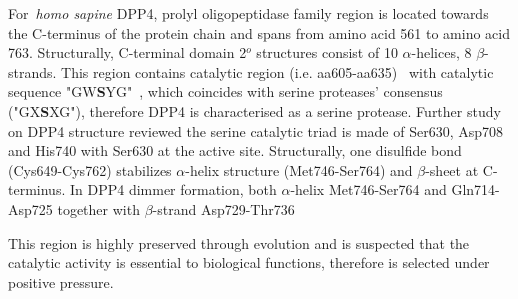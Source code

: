 For~\textit{homo sapine} DPP4, prolyl oligopeptidase family region is located towards the C-terminus of the protein chain and spans from amino acid 561 to amino acid 763. Structurally, C-terminal domain 2$^{o}$ structures consist of 10 $\alpha$-helices, 8 $\beta$-strands. This region contains catalytic region (i.e. aa605-aa635)~\cite{Rawlings1991,Barrett1992,Polgár1992,Rawlings1994} with catalytic sequence "GW\textbf{S}YG"~\cite{Ogata_1992}, which coincides with serine proteases' consensus ("GX\textbf{S}XG"), therefore DPP4 is characterised as a serine protease. Further study on DPP4 structure reviewed the serine catalytic triad is made of Ser630, Asp708 and His740 with Ser630 at the active site. Structurally, one disulfide bond (Cys649-Cys762) stabilizes $\alpha$-helix structure (Met746-Ser764) and $\beta$-sheet at C-terminus. In DPP4 dimmer formation, both $\alpha$-helix Met746-Ser764 and Gln714-Asp725 together with $\beta$-strand Asp729-Thr736 
\par
This region is highly preserved through evolution and is suspected that the catalytic activity is essential to biological functions, therefore is selected under positive pressure. 